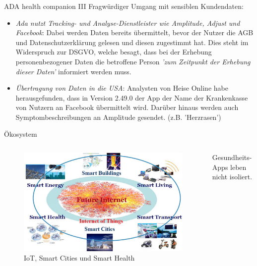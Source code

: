 \documentclass[aspectratio=169,t]{beamer}
\begin{document}
\begin{frame}{ADA health companion III}
    Fragwürdiger Umgang mit sensiblen Kundendaten:
    \begin{itemize}
        \item \textit{Ada nutzt Tracking- und Analyse-Dienstleister wie Amplitude, Adjust und Facebook}: Dabei werden Daten bereits übermittelt, bevor der Nutzer die AGB und Datenschutzerklärung gelesen und diesen zugestimmt hat. Dies steht im Widerspruch zur DSGVO, welche besagt, dass bei der Erhebung personenbezogener Daten die betroffene Person \textit{'zum Zeitpunkt der Erhebung dieser Daten'} informiert werden muss. \cite{ADA6}
        \item<2-> \textit{Übertragung von Daten in die USA}: Analysten von Heise Online habe herausgefunden, dass in Version 2.49.0 der App der Name der Krankenkasse von Nutzern an Facebook übermittelt wird. Darüber hinaus werden auch Symptombeschreibungen an Amplitude gesendet. (z.B. 'Herzrasen') \cite{ADA6}
    \end{itemize}
\end{frame}

\begin{frame}{Ökosystem}
    \begin{columns}
        \begin{column}{0.5\textwidth}
            \begin{figure}
                \centering
                \includegraphics[width=\textwidth]{Bilder/Iot_apps.jpg}
                \caption{IoT, Smart Cities und Smart Health \cite{IoTapps}}
            \end{figure}
        \end{column}
        \begin{column}{0.5\textwidth}
            Gesundheits-Apps leben nicht isoliert.\\\vspace{0.5cm}
        \end{column}
    \end{columns}
\end{frame}
\end{document}
